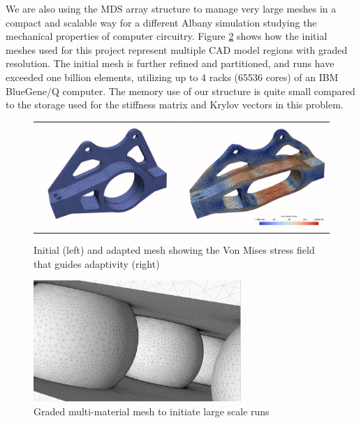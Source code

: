 We are also using the MDS array structure to manage very large meshes
in a compact and scalable way for a different Albany simulation
studying the mechanical properties of computer circuitry.
Figure \ref{fig:ibm} shows how the initial
meshes used for this project represent
multiple CAD model regions with graded resolution.
The initial mesh is further refined and partitioned,
and runs have exceeded one billion elements, utilizing
up to 4 racks (65536 cores) of an IBM BlueGene/Q computer.
The memory use of our structure is quite small compared
to the storage used for the stiffness matrix and
Krylov vectors in this problem.

\begin{figure}
\centering
\begin{tabular}{cc}
  \includegraphics[width=.5\textwidth]{albany1.png}&
  \includegraphics[width=.5\textwidth]{albany2.png}
\end{tabular}
\caption{Initial (left) and adapted mesh showing the Von Mises stress field that
guides adaptivity (right)} \label{fig:albany-mesh}
\end{figure}

\begin{figure}
\begin{center}
\includegraphics[width=0.7\textwidth]{ibm.png}
\caption{Graded multi-material mesh to initiate large scale runs}
\label{fig:ibm}
\end{center}
\end{figure}


